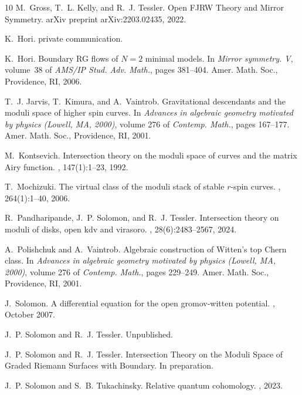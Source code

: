 \documentclass[11pt]{amsart}
\theoremstyle{definition}
\theoremstyle{remark}
\newcommand{\<}{\left<}
\renewcommand{\>}{\right>}
\numberwithin{equation}{section}
\begin{document}
\begin{thebibliography}{10}
M.~Gross, T.~L. Kelly, and R.~J. Tessler.
\newblock Open {FJRW} {T}heory and {M}irror {S}ymmetry.
\newblock arXiv preprint arXiv:2203.02435, 2022.

K.~Hori.
\newblock private communication.

K.~Hori.
\newblock Boundary {RG} flows of {$N=2$} minimal models.
\newblock In {\em Mirror symmetry. {V}}, volume~38 of {\em AMS/IP Stud. Adv.
  Math.}, pages 381--404. Amer. Math. Soc., Providence, RI, 2006.

T.~J. Jarvis, T.~Kimura, and A.~Vaintrob.
\newblock Gravitational descendants and the moduli space of higher spin curves.
\newblock In {\em Advances in algebraic geometry motivated by physics
  ({L}owell, {MA}, 2000)}, volume 276 of {\em Contemp. Math.}, pages 167--177.
  Amer. Math. Soc., Providence, RI, 2001.

M.~Kontsevich.
\newblock Intersection theory on the moduli space of curves and the matrix
  {A}iry function.
, 147(1):1--23, 1992.

T.~Mochizuki.
\newblock The virtual class of the moduli stack of stable {$r$}-spin curves.
, 264(1):1--40, 2006.

R.~Pandharipande, J.~P. Solomon, and R.~J. Tessler.
\newblock Intersection theory on moduli of disks, open kdv and virasoro.
, 28(6):2483--2567, 2024.

A.~Polishchuk and A.~Vaintrob.
\newblock Algebraic construction of {W}itten's top {C}hern class.
\newblock In {\em Advances in algebraic geometry motivated by physics
  ({L}owell, {MA}, 2000)}, volume 276 of {\em Contemp. Math.}, pages 229--249.
  Amer. Math. Soc., Providence, RI, 2001.

J.~Solomon.
\newblock A differential equation for the open gromov-witten potential.
, October 2007.

J.~P. Solomon and R.~J. Tessler.
\newblock Unpublished.

J.~P. Solomon and R.~J. Tessler.
\newblock Intersection {T}heory on the {M}oduli {S}pace of {G}raded {R}iemann
  {S}urfaces with {B}oundary.
\newblock In preparation.

J.~P. Solomon and S.~B. Tukachinsky.
\newblock Relative quantum cohomology.
, 2023.


\end{thebibliography}
\end{document}
